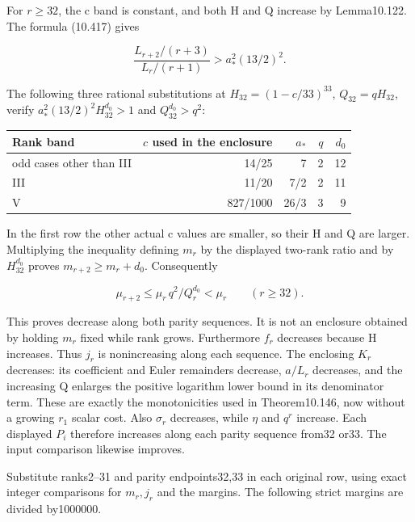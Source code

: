 \documentclass[
  11pt,
  a4paper,
]{article}
\newcounter{none} %
\begin{document}
For \(r\ge32\), the c band is constant, and both H and Q increase by
Lemma10.122. The formula (10.417) gives

\[
\frac{L_{r+2}/(r+3)}{L_r/(r+1)}
>a_*^2(13/2)^2.
\tag{10.435}
\]

The following three rational substitutions at \(H_{32}=(1-c/33)^{33}\),
\(Q_{32}=qH_{32}\), verify \(a_*^2(13/2)^2H_{32}^{d_0}>1\) and
\(Q_{32}^{d_0}>q^2\):

{\def\LTcaptype{none} %
\begin{longtable}[]{@{}lrrrr@{}}
\toprule\noalign{}
Rank band & \(c\) used in the enclosure & \(a_*\) & \(q\) & \(d_0\) \\
\midrule\noalign{}
\endhead
\bottomrule\noalign{}
\endlastfoot
odd cases other than III & 14/25 & 7 & 2 & 12 \\
III & 11/20 & 7/2 & 2 & 11 \\
V & 827/1000 & 26/3 & 3 & 9 \\
\end{longtable}
}

In the first row the other actual c values are smaller, so their H and Q
are larger. Multiplying the inequality defining \(m_r\) by the displayed
two-rank ratio and by \(H_{32}^{d_0}\) proves \(m_{r+2}\ge m_r+d_0\).
Consequently

\[
\mu_{r+2}\le\mu_r\,q^2/Q_r^{d_0}<\mu_r
\qquad(r\ge32).
\tag{10.436}
\]

This proves decrease along both parity sequences. It is not an enclosure
obtained by holding \(m_r\) fixed while rank grows. Furthermore \(f_r\)
decreases because H increases. Thus \(j_r\) is nonincreasing along each
sequence. The enclosing \(K_r\) decreases: its coefficient and Euler
remainders decrease, \(a/L_r\) decreases, and the increasing Q enlarges
the positive logarithm lower bound in its denominator term. These are
exactly the monotonicities used in Theorem10.146, now without a growing
\(r_1\) scalar cost. Also \(\sigma_r\) decreases, while \(\eta\) and
\(q^r\) increase. Each displayed \(P_i\) therefore increases along each
parity sequence from32 or33. The input comparison likewise improves.

Substitute ranks2--31 and parity endpoints32,33 in each original row,
using exact integer comparisons for \(m_r,j_r\) and the margins. The
following strict margins are divided by1000000.
\end{document}
